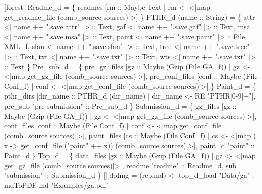 \begin{code}
[forest|
   Readme_d =  \{
    readmes  [rm :: Maybe Text | rm <- <|map get_readme_file (comb_source sources)|>]
  \}
\mbox{}
   PTHR_d (name :: String)  =  \{
   attr    <| name ++ ".save.attr"  |> :: Text,
   gaf     <| name ++ ".save.gaf"   |> :: Text,
   msa     <| name ++ ".save.msa"   |> :: Text,
   paint   <| name ++ ".save.paint" |> :: File XML_f,
   sfan    <| name ++ ".save.sfan"  |> :: Text,
   tree    <| name ++ ".save.tree"  |> :: Text,
   txt     <| name ++ ".save.txt"   |> :: Text, 
   wts     <| name ++ ".save.txt"   |> :: Text
  \}
\mbox{}
   Pre_sub_d =  \{
    pre_gz_files    [gz   :: Maybe (Gzip (File GA_f)) | gz   <- <|map get_gz_file   (comb_source sources)|>],
    pre_conf_files  [conf :: Maybe (File Conf_f)      | conf <- <|map get_conf_file (comb_source sources)|>]
  \}
\mbox{}
   Paint_d =  \{
    pthr_dirs  [dir_name :: PTHR_d (dir_name) | dir_name <-  RE "PTHR[0-9]+"],
    pre_sub    "pre-submission" :: Pre_sub_d
  \}
\mbox{}
   Submission_d =  \{
    gz_files     [gz   :: Maybe (Gzip (File GA_f)) | gz   <- <|map get_gz_file   (comb_source sources)|>],
    conf_files   [conf :: Maybe (File Conf_f)      | conf <- <|map get_conf_file (comb_source sources)|>],
    paint_files  [cs   :: Maybe (File Conf_f) 
                        | cs <- <|map (\\x -> get_conf_file ("paint" ++ x)) (comb_source sources)|>], 
    paint_d      "paint"               :: Paint_d
  \}
\mbox{}
   Top_d =  \{
    data_files  [gz :: Maybe (Gzip (File GA_f)) | 
			gz <- <|map get_gz_file (comb_source sources)|>],
    readme      "readme"             :: Readme_d,
    sub         "submission"         :: Submission_d
  \}
|]
\mbox{}
doImg = 
 { (rep,md) <- top_d_load "Data/ga"
 ; mdToPDF md "Examples/ga.pdf"
 }
\end{code}

